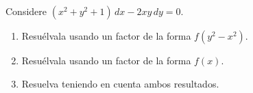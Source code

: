 Considere $(x^2+y^2+1)\,dx-2xy\,dy=0$.

\begin{enumerate}[label=(\alph*),ref=\alph*,leftmargin=*]
\item Resuélvala usando un factor de la forma $f(y^2-x^2)$.
\item Resuélvala usando un factor de la forma $f(x)$.
\item Resuelva teniendo en cuenta ambos resultados.
\end{enumerate}
